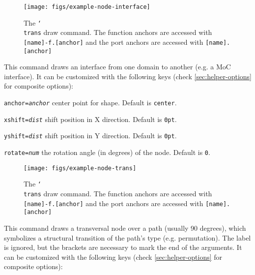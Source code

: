\begin{figure}[htb]\centering
\texttt{[image: figs/example-node-interface]}

\caption{The \texttt{\char`\\trans} draw command. The function anchors are accessed with \texttt{[name]-f.[anchor]} and the port anchors are accessed with \texttt{[name].[anchor]}}
\end{figure}
\hspace{1pt}

\noindent This command draws an interface from one domain to another (e.g. a MoC interface). It can be customized with the following keys (check \ref{sec:helper-options} for composite options):

\begin{optionslist}
\item \texttt{anchor=\it anchor} center point for shape. Default is \texttt{center}.
\item \texttt{xshift=\it dist} shift position in X direction. Default is \texttt{0pt}.
\item \texttt{yshift=\it dist} shift position in Y direction. Default is \texttt{0pt}.
\item \texttt{rotate=\it num} the rotation angle (in degrees) of the node. Default is \texttt{0}.
\end{optionslist}


\begin{figure}[htb]\centering
\texttt{[image: figs/example-node-trans]}

\caption{The \texttt{\char`\\trans} draw command. The function anchors are accessed with \texttt{[name]-f.[anchor]} and the port anchors are accessed with \texttt{[name].[anchor]}}
\end{figure}
\hspace{1pt}

\noindent This command draws a transversal node over a path (usually 90 degrees), which symbolizes a structural transition of the path's type (e.g. permutation). The label is ignored, but the brackets are necessary to mark the end of the arguments. It can be customized with the following keys (check \ref{sec:helper-options} for composite options):

